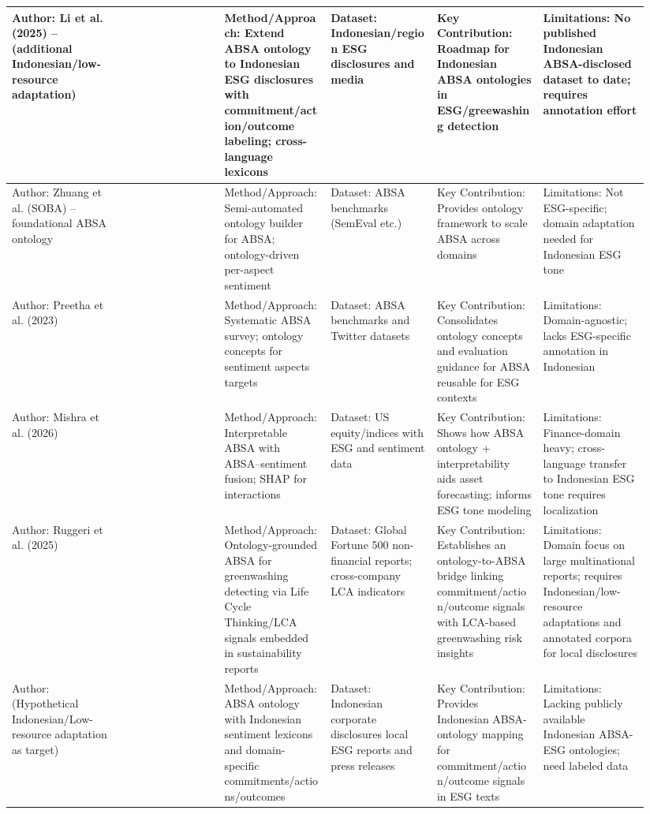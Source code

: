 \documentclass{article}
\begin{document}
\begin{landscape}
\begin{longtable}{p{0.157\linewidth} p{0.157\linewidth} p{0.157\linewidth} p{0.157\linewidth} p{0.157\linewidth} p{0.157\linewidth}}
Author: Li et al. (2025) – (additional Indonesian/low-resource adaptation) & ~ & Method/Approach: Extend ABSA ontology to Indonesian ESG disclosures with commitment/action/outcome labeling; cross-language lexicons & Dataset: Indonesian/region ESG disclosures and media & Key Contribution: Roadmap for Indonesian ABSA ontologies in ESG/greewashing detection & Limitations: No published Indonesian ABSA-disclosed dataset to date; requires annotation effort \\ \hline
Author: Zhuang et al. (SOBA) – foundational ABSA ontology & ~ & Method/Approach: Semi-automated ontology builder for ABSA; ontology-driven per-aspect sentiment & Dataset: ABSA benchmarks (SemEval etc.) & Key Contribution: Provides ontology framework to scale ABSA across domains & Limitations: Not ESG-specific; domain adaptation needed for Indonesian ESG tone \\ \hline
Author: Preetha et al. (2023) & ~ & Method/Approach: Systematic ABSA survey; ontology concepts for sentiment aspects targets & Dataset: ABSA benchmarks and Twitter datasets & Key Contribution: Consolidates ontology concepts and evaluation guidance for ABSA reusable for ESG contexts & Limitations: Domain-agnostic; lacks ESG-specific annotation in Indonesian \\ \hline
Author: Mishra et al. (2026) & ~ & Method/Approach: Interpretable ABSA with ABSA–sentiment fusion; SHAP for interactions & Dataset: US equity/indices with ESG and sentiment data & Key Contribution: Shows how ABSA ontology + interpretability aids asset forecasting; informs ESG tone modeling & Limitations: Finance-domain heavy; cross-language transfer to Indonesian ESG tone requires localization \\ \hline
Author: Ruggeri et al. (2025) & ~ & Method/Approach: Ontology-grounded ABSA for greenwashing detecting via Life Cycle Thinking/LCA signals embedded in sustainability reports & Dataset: Global Fortune 500 non-financial reports; cross-company LCA indicators & Key Contribution: Establishes an ontology-to-ABSA bridge linking commitment/action/outcome signals with LCA-based greenwashing risk insights & Limitations: Domain focus on large multinational reports; requires Indonesian/low-resource adaptations and annotated corpora for local disclosures \\ \hline
Author: (Hypothetical Indonesian/Low-resource adaptation as target) & ~ & Method/Approach: ABSA ontology with Indonesian sentiment lexicons and domain-specific commitments/actions/outcomes & Dataset: Indonesian corporate disclosures local ESG reports and press releases & Key Contribution: Provides Indonesian ABSA-ontology mapping for commitment/action/outcome signals in ESG texts & Limitations: Lacking publicly available Indonesian ABSA-ESG ontologies; need labeled data \\ \hline

\end{longtable}
\end{landscape}
\end{document}
